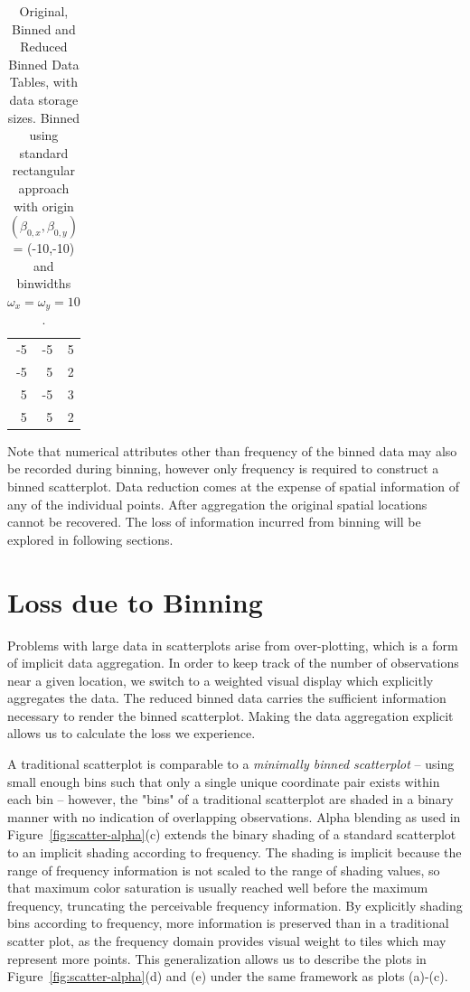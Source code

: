 \documentclass[11pt]{isuthesis}\usepackage[]{graphicx}\usepackage[]{color}
\begin{document}
\begin{table}[hbtp]
\begin{minipage}[t]{.33\textwidth}
{\begin{tabularx}{.7\textwidth}{rrr}
-5 & -5 & 5 \\ 
  -5 & 5 & 2 \\ 
  5 & -5 & 3 \\ 
  5 & 5 & 2 \\  \hline
\end{tabularx}}
\end{minipage}
\caption{\label{DataReductionExample}Original, Binned and Reduced Binned Data Tables, with data storage sizes.  Binned using standard rectangular approach with origin $(\beta_{0,x},\beta_{0,y})$ = (-10,-10) and binwidths $\omega_x = \omega_y = 10$. }
\end{table}

Note that numerical attributes other than frequency of the binned data may also be recorded during binning, however only frequency is required to construct a binned scatterplot. Data reduction comes at the expense of spatial information of any of the individual points. After aggregation the original spatial locations cannot be recovered. The loss of information incurred from binning will be explored in following sections. 


\section{Loss due to Binning}
\label{LossIntro}

Problems with large data in scatterplots arise from over-plotting, which is a form of implicit data aggregation. In order to keep track of the number of observations near a given location, we switch to a weighted visual display which explicitly aggregates the data. The reduced binned data carries the sufficient information necessary to render the binned scatterplot. Making the data aggregation explicit allows us to calculate the loss we experience.

A traditional scatterplot is comparable to a \textit{minimally binned scatterplot} -- using small enough bins such that only a single unique coordinate pair exists within each bin --  however, the "bins" of a traditional scatterplot are shaded in a binary manner with no indication of overlapping observations. Alpha blending as used in Figure~\ref{fig:scatter-alpha}(c) extends the binary shading of a standard scatterplot to an implicit shading according to frequency. The shading is implicit because the range of frequency information is not scaled to the range of shading values, so that maximum color saturation is usually reached well before the maximum frequency, truncating the perceivable frequency information. By explicitly shading bins according to frequency, more information is preserved than in a traditional scatter plot, as the frequency domain provides visual weight to tiles which may represent more points. This generalization allows us to describe the plots in Figure~\ref{fig:scatter-alpha}(d) and (e) under the same framework as plots (a)-(c). 
\end{document}
